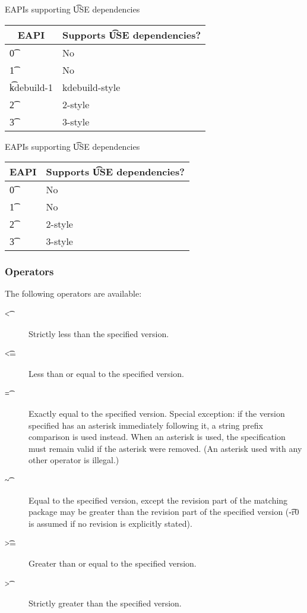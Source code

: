 \IFKDEBUILDELSE
{
    \begin{centertable}{EAPIs supporting \t{USE} dependencies} \label{tab:use-deps-table}
    \begin{tabular}{ l l }
        \toprule
        \multicolumn{1}{c}{\textbf{EAPI}} &
        \multicolumn{1}{c}{\textbf{Supports \t{USE} dependencies?}} \\
        \midrule
    \t{0} & No \\
    \t{1} & No \\
    \t{kdebuild-1} & kdebuild-style \\
    \t{2} & 2-style \\
    \t{3} & 3-style \\
    \bottomrule
    \end{tabular}
    \end{centertable}
}{
    \begin{centertable}{EAPIs supporting \t{USE} dependencies} \label{tab:use-deps-table}
    \begin{tabular}{ l l }
        \toprule
        \multicolumn{1}{c}{\textbf{EAPI}} &
        \multicolumn{1}{c}{\textbf{Supports \t{USE} dependencies?}} \\
        \midrule
    \t{0} & No \\
    \t{1} & No \\
    \t{2} & 2-style \\
    \t{3} & 3-style \\
    \bottomrule
    \end{tabular}
    \end{centertable}
}

\subsubsection{Operators}
\label{sec:dep-operator}

The following operators are available:

\begin{description}
\item[\t{<}] Strictly less than the specified version.
\item[\t{<=}] Less than or equal to the specified version.
\item[\t{=}] Exactly equal to the specified version. Special exception: if the version
    specified has an asterisk immediately following it, a string prefix comparison is
    used instead. When an asterisk is used, the specification must remain valid if the
    asterisk were removed. (An asterisk used with any other operator is illegal.)
\item[\t{\textasciitilde}] Equal to the specified version, except the revision part of the matching
    package may be greater than the revision part of the specified version (\t{-r0} is
    assumed if no revision is explicitly stated).
\item[\t{>=}] Greater than or equal to the specified version.
\item[\t{>}] Strictly greater than the specified version.
\end{description}

